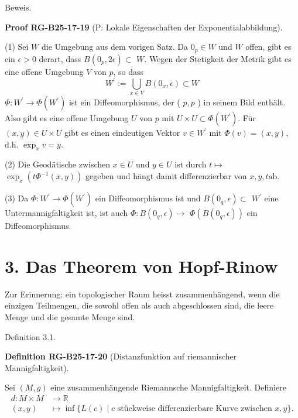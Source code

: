 \documentclass[10pt, letterpaper]{article}
\newcommand{\CustomHeading}[3]{%
  \par\medskip\noindent%
  \textbf{#1 #2} \textnormal{(#3)}.\enskip%
}
\newenvironment{DEF}[2]{\begin{unitbox}\CustomHeading{Definition}{#1}{#2}}{\end{unitbox}}
\newenvironment{PROOF}[2]{\begin{unitbox}\CustomHeading{Proof}{#1}{#2}}{\end{unitbox}}
\begin{document}
Beweis. 

\begin{PROOF}{RG-B25-17-19}{P: Lokale Eigenschaften der Exponentialabbildung}
(1) Sei $W$ die Umgebung aus dem vorigen Satz. Da $0_{p} \in W$ und $W$ offen, gibt es ein $\epsilon>0$ derart, dass $B\left(0_{p}, 2 \epsilon\right) \subset$ $W$. Wegen der Stetigkeit der Metrik gibt es eine offene Umgebung $V$ von $p$, so dass
$$
W^{\prime}:=\bigcup_{x \in V} B\left(0_{x}, \epsilon\right) \subset W
$$
$\Phi: W^{\prime} \rightarrow \Phi\left(W^{\prime}\right)$ ist ein Diffeomorphismus, der ( $p, p$ ) in seinem Bild enthält. Also gibt es eine offene Umgebung $U$ von $p$ mit $U \times U \subset \Phi\left(W^{\prime}\right)$. Für $(x, y) \in U \times U$ gibt es einen eindeutigen Vektor $v \in W^{\prime}$ mit $\Phi(v)=(x, y)$, d.h. $\exp _{x} v=y$.

(2) Die Geodätische zwischen $x \in U$ und $y \in U$ ist durch $t \mapsto$ $\exp _{x}\left(t \Phi^{-1}(x, y)\right)$ gegeben und hängt damit differenzierbar von $x, y, t \mathrm{ab}$.


(3) Da $\Phi: W^{\prime} \rightarrow \Phi\left(W^{\prime}\right)$ ein Diffeomorphismus ist und $B\left(0_{q}, \epsilon\right) \subset$ $W^{\prime}$ eine Untermannigfaltigkeit ist, ist auch $\Phi: B\left(0_{q}, \epsilon\right) \rightarrow$ $\Phi\left(B\left(0_{q}, \epsilon\right)\right)$ ein Diffeomorphismus.
\end{PROOF}




\section*{3. Das Theorem von Hopf-Rinow}


Zur Erinnerung: ein topologischer Raum heisst zusammenhängend, wenn die einzigen Teilmengen, die sowohl offen als auch abgeschlossen sind, die leere Menge und die gesamte Menge sind.



Definition 3.1. 

\begin{DEF}{RG-B25-17-20}{Distanzfunktion auf riemannischer Mannigfaltigkeit}
Sei $(M, g)$ eine zusammenhängende Riemannsche Mannigfaltigkeit. Definiere
$$
\begin{aligned}
d: M \times M & \rightarrow \mathbb{R} \\
(x, y) & \mapsto \inf \{L(c) \mid c \text { stückweise differenzierbare Kurve zwischen } x, y\} .
\end{aligned}
$$
\end{DEF}
\end{document}
